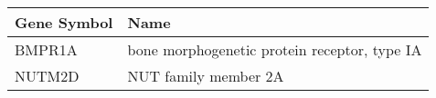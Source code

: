 \begin{tabular}{ll}
\toprule
Gene Symbol &                                         Name \\
\midrule
     BMPR1A & bone morphogenetic protein receptor, type IA \\
     NUTM2D &                         NUT family member 2A \\
\bottomrule
\end{tabular}
